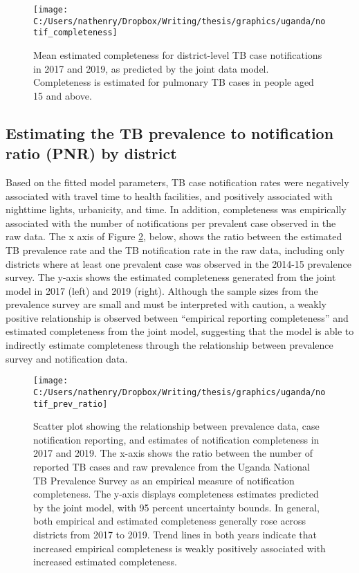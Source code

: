 \documentclass[
]{article}
\begin{document}
\begin{figure}[!ht]

{\centering \texttt{[image: C:/Users/nathenry/Dropbox/Writing/thesis/graphics/uganda/notif\_completeness]} 

}

\caption{Mean estimated completeness for district-level TB case notifications in 2017 and 2019, as predicted by the joint data model. Completeness is estimated for pulmonary TB cases in people aged 15 and above.}\label{fig:notif-completeness}
\end{figure}

\hypertarget{estimating-the-tb-prevalence-to-notification-ratio-pnr-by-district}{%
\subsection{Estimating the TB prevalence to notification ratio (PNR) by district}\label{estimating-the-tb-prevalence-to-notification-ratio-pnr-by-district}}

Based on the fitted model parameters, TB case notification rates were negatively associated with travel time to health facilities, and positively associated with nighttime lights, urbanicity, and time. In addition, completeness was empirically associated with the number of notifications per prevalent case observed in the raw data. The x axis of Figure \ref{fig:notif-prev-ratio}, below, shows the ratio between the estimated TB prevalence rate and the TB notification rate in the raw data, including only districts where at least one prevalent case was observed in the 2014-15 prevalence survey. The y-axis shows the estimated completeness generated from the joint model in 2017 (left) and 2019 (right). Although the sample sizes from the prevalence survey are small and must be interpreted with caution, a weakly positive relationship is observed between ``empirical reporting completeness'' and estimated completeness from the joint model, suggesting that the model is able to indirectly estimate completeness through the relationship between prevalence survey and notification data.

\begin{figure}[!ht]

{\centering \texttt{[image: C:/Users/nathenry/Dropbox/Writing/thesis/graphics/uganda/notif\_prev\_ratio]} 

}

\caption{Scatter plot showing the relationship between prevalence data, case notification reporting, and estimates of notification completeness in 2017 and 2019. The x-axis shows the ratio between the number of reported TB cases and raw prevalence from the Uganda National TB Prevalence Survey as an empirical measure of notification completeness. The y-axis displays completeness estimates predicted by the joint model, with 95 percent uncertainty bounds. In general, both empirical and estimated completeness generally rose across districts from 2017 to 2019. Trend lines in both years indicate that increased empirical completeness is weakly positively associated with increased estimated completeness.}\label{fig:notif-prev-ratio}
\end{figure}
\end{document}
